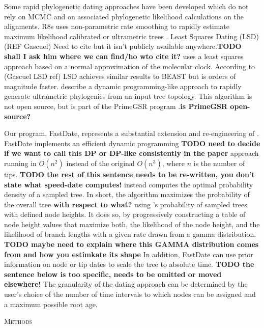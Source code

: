 \documentclass{llncs}
\newcommand{\ejmcomment}[1]{{\color{green} #1}}
\renewcommand{\section}[1]{%
\bigskip
\begin{center}
\begin{Large}
\normalfont\scshape #1
\medskip
\end{Large}
\end{center}}
\begin{document}
Some rapid phylogenetic dating approaches have been developed which do not rely on MCMC and on associated phylogenetic likelihood calculations on the alignments.\@
R8s uses non-parametric rate smoothing to rapidly estimate 
maximum likelihood calibrated or ultrametric trees \citep{Sanderson2003}.
Least Squares Dating (LSD) (REF Gascuel) 
\ejmcomment{Need to cite but it isn't publicly available anywhere.}{\bf TODO shall I ask him where we can find/ho wto cite it?}
uses a least squares approach based on a normal approximation of the molecular clock.
According to (Gascuel LSD ref) LSD achieves similar results to BEAST but is orders of magnitude faster. 
\cite{Akerborg2008} describe a dynamic programming-like approach to 
rapidly generate ultrametric phylogenies from an input tree topology.
This algorithm is not open source, but is part of the PrimeGSR program \citep{Akerborg2009}.{\bf is PrimeGSR open-source?}

Our program, FastDate, represents a substantial extension and re-engineering of \cite{Akerborg2008}.
FastDate implements an efficient dynamic programming {\bf TODO need to decide if we want to call this DP or DP-like consistently in the paper} 
approach running  in $O(n^2)$ instead of the original $O(n^3)$, where $n$ is the number of tips.
{\bf TODO the rest of this sentence needs to be re-written, you don't state what speed-date computes!} instead computes the 
optimal probability density of a sampled tree.
In short, the algorithm maximizes the probability of the overall tree {\bf with respect to what?} using \cite{Stadler2010}'s 
probability of sampled trees with defined node heights.
It does so, by progressively constructing a table of node height values that maximize both, the likelihood of 
the node height,  and the likelihood of branch lengths with a given rate drawn from a gamma distribution.
{\bf TODO maybe need to explain where this GAMMA distribution comes from and how you estimkate its shape}
In addition, FastDate can use prior information on node or tip dates to scale the tree to
absolute time.
{\bf TODO the sentence below is too specific, needs to be omitted or moved elsewhere!}
The granularity of the dating approach can be determined by the user's choice of the number of time intervals to which 
nodes can be assigned and a maximum possible root age.

\section{Methods}
\end{document}
